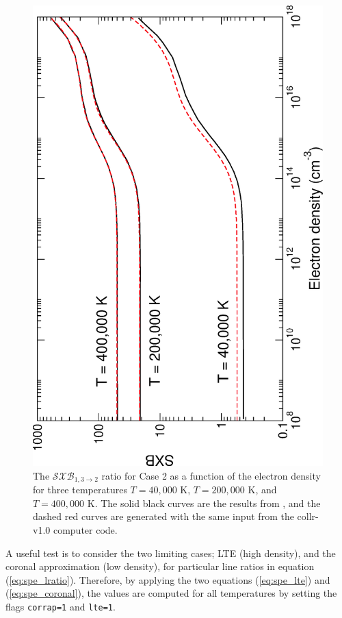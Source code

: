 %
\begin{figure}
\includegraphics[scale=0.55,angle=-90]{Figures/Spectral/comparison2.eps}
\caption{The $\mathcal{SXB}_{1,3\rightarrow 2}$ ratio for Case 2 as a function of the electron density for three temperatures $T=40,000$ K, $T=200,000$ K, and $T=400,000$ K. The solid black curves are the results from \citet{2007JPhB...40.4537G}, and the dashed red curves are generated with the same input from the {\sc collr-v1.0} computer code. \label{fig:spe_sxb2}}
\end{figure}
%

A useful test is to consider the two limiting cases; LTE (high density), and the coronal approximation (low density), for particular line ratios in equation (\ref{eq:spe_lratio}). Therefore, by applying the two equations (\ref{eq:spe_lte}) and (\ref{eq:spe_coronal}), the values are computed for all temperatures by setting the flags \texttt{corrap=1} and \texttt{lte=1}.

